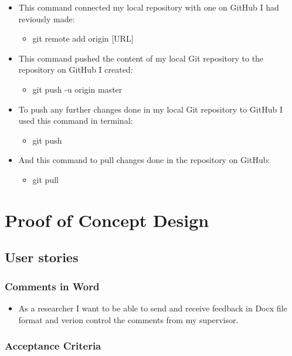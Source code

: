 \documentclass{article}
\begin{document}
\begin{itemize}
    \item This command connected my local repository with one on GitHub I had reviously made:
    \begin{itemize}
        \item git remote add origin [URL]
    \end{itemize}
    \item This command pushed the content of my local Git repository to the repository on GitHub I created:
    \begin{itemize}
        \item git push -u origin master
    \end{itemize}
    \item To push any further changes done in my local Git repository to GitHub I used this command in terminal:
    \begin{itemize}
        \item git push
    \end{itemize}
    \item And this command to pull changes done in the repository on GitHub:
    \begin{itemize}
        \item git pull
    \end{itemize}
    
\end{itemize}

\section{Proof of Concept Design}

\subsection{User stories}

\subsubsection{Comments in Word}

\begin{itemize}
    \item As a researcher I want to be able to send and receive feedback in Docx file format and verion control the comments from my supervisor.
\end{itemize}

\subsubsection{Acceptance Criteria}
\end{document}
